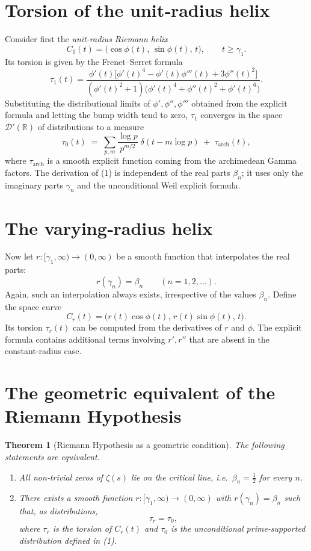 \documentclass[12pt,a4paper]{article}
\newtheorem{theorem}{Theorem}[section]
\newcommand{\R}{\mathbb{R}}
\newcommand{\dist}{\mathcal{D}'}
\begin{document}
\section{Torsion of the unit‑radius helix}

Consider first the \emph{unit‑radius Riemann helix}
\[
C_1(t) = \bigl(\cos\phi(t),\,\sin\phi(t),\,t\bigr),\qquad t\ge\gamma_1 .
\]
Its torsion is given by the Frenet–Serret formula
\[
\tau_1(t) = \frac{\phi'(t)\bigl[\phi'(t)^4 - \phi'(t)\phi'''(t) + 3\phi''(t)^2\bigr]}
                 {(\phi'(t)^2+1)\bigl(\phi'(t)^4+\phi''(t)^2+\phi'(t)^6\bigr)} .
\]
Substituting the distributional limits of $\phi',\phi'',\phi'''$ obtained from the explicit formula and letting the bump width tend to zero, $\tau_1$ converges in the space $\dist(\R)$ of distributions to a measure
\[
\tau_0(t) \;=\; \sum_{p,m}\frac{\log p}{p^{m/2}}\;\delta(t-m\log p) \;+\; \tau_{\text{arch}}(t),
\tag{1}
\]
where $\tau_{\text{arch}}$ is a smooth explicit function coming from the archimedean Gamma factors.  The derivation of (1) is independent of the real parts $\beta_n$; it uses only the imaginary parts $\gamma_n$ and the unconditional Weil explicit formula.

\section{The varying‑radius helix}

Now let $r:[\gamma_1,\infty)\to(0,\infty)$ be a smooth function that interpolates the real parts:
\[
r(\gamma_n) = \beta_n \qquad (n=1,2,\dots).
\]
Again, such an interpolation always exists, irrespective of the values $\beta_n$.  Define the space curve
\[
C_r(t) = \bigl( r(t)\cos\phi(t),\, r(t)\sin\phi(t),\, t \bigr).
\]
Its torsion $\tau_r(t)$ can be computed from the derivatives of $r$ and $\phi$.  The explicit formula contains additional terms involving $r',r''$ that are absent in the constant‑radius case.

\section{The geometric equivalent of the Riemann Hypothesis}

\begin{theorem}[Riemann Hypothesis as a geometric condition]\label{thm:RH_geom}
The following statements are equivalent.
\begin{enumerate}
\item[(i)] All non‑trivial zeros of $\zeta(s)$ lie on the critical line, i.e.\ $\beta_n=\frac12$ for every $n$.
\item[(ii)] There exists a smooth function $r:[\gamma_1,\infty)\to(0,\infty)$ with $r(\gamma_n)=\beta_n$ such that, as distributions,
\[
\tau_r = \tau_0,
\]
where $\tau_r$ is the torsion of $C_r(t)$ and $\tau_0$ is the unconditional prime‑supported distribution defined in (1).
\end{enumerate}
\end{theorem}
\end{document}
